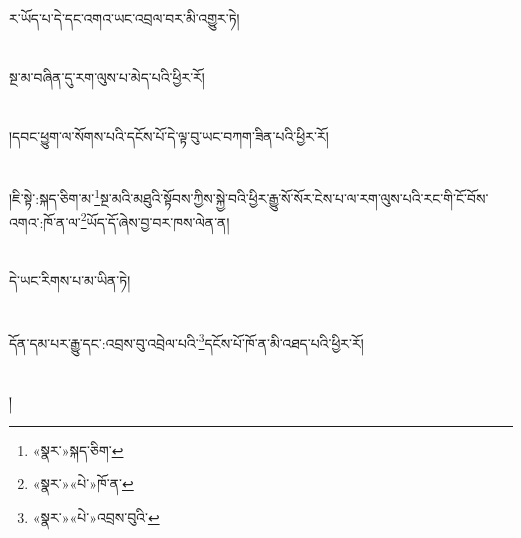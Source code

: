 ར་ཡོད་པ་དེ་དང་འགའ་ཡང་འབྲལ་བར་མི་འགྱུར་ཏེ།\chapter{ }སྔ་མ་བཞིན་དུ་རག་ལུས་པ་མེད་པའི་ཕྱིར་རོ།\chapter{ }།དབང་ཕྱུག་ལ་སོགས་པའི་དངོས་པོ་དེ་ལྟ་བུ་ཡང་བཀག་ཟིན་པའི་ཕྱིར་རོ།\chapter{ }།ཇི་སྟེ་:སྐད་ཅིག་མ་\footnote{«སྣར་»སྐད་ཅིག་}སྔ་མའི་མཐུའི་སྟོབས་ཀྱིས་སྐྱེ་བའི་ཕྱིར་རྒྱུ་སོ་སོར་ངེས་པ་ལ་རག་ལུས་པའི་རང་གི་ངོ་བོས་འགའ་:ཁོ་ན་ལ་\footnote{«སྣར་»«པེ་»ཁོ་ན་}ཡོད་དོ་ཞེས་བྱ་བར་ཁས་ལེན་ན།\chapter{ }དེ་ཡང་རིགས་པ་མ་ཡིན་ཏེ།\chapter{ }དོན་དམ་པར་རྒྱུ་དང་:འབྲས་བུ་འབྲེལ་པའི་\footnote{«སྣར་»«པེ་»འབྲས་བུའི་}དངོས་པོ་ཁོ་ན་མི་འཐད་པའི་ཕྱིར་རོ།\chapter{ }།
